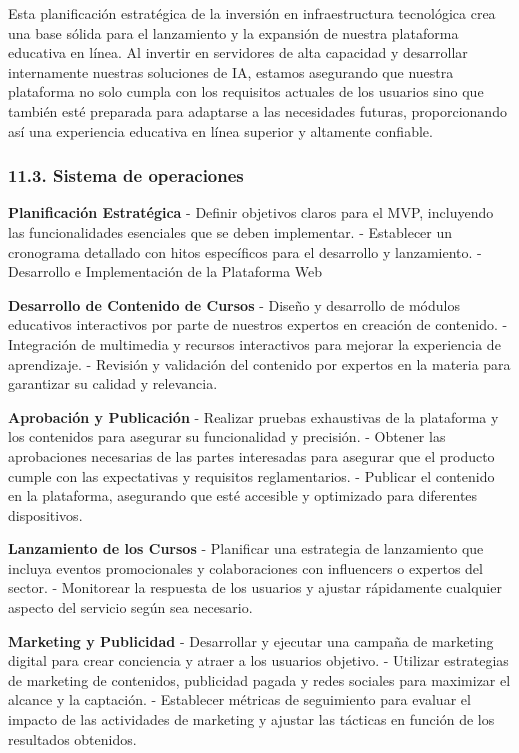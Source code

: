 \documentclass[
]{article}
\begin{document}
Esta planificación estratégica de la inversión en infraestructura
tecnológica crea una base sólida para el lanzamiento y la expansión de
nuestra plataforma educativa en línea. Al invertir en servidores de alta
capacidad y desarrollar internamente nuestras soluciones de IA, estamos
asegurando que nuestra plataforma no solo cumpla con los requisitos
actuales de los usuarios sino que también esté preparada para adaptarse
a las necesidades futuras, proporcionando así una experiencia educativa
en línea superior y altamente confiable.

\subsubsection{11.3. Sistema de
operaciones}\label{sistema-de-operaciones}

\textbf{Planificación Estratégica} - Definir objetivos claros para el
MVP, incluyendo las funcionalidades esenciales que se deben implementar.
- Establecer un cronograma detallado con hitos específicos para el
desarrollo y lanzamiento. - Desarrollo e Implementación de la Plataforma
Web

\textbf{Desarrollo de Contenido de Cursos} - Diseño y desarrollo de
módulos educativos interactivos por parte de nuestros expertos en
creación de contenido. - Integración de multimedia y recursos
interactivos para mejorar la experiencia de aprendizaje. - Revisión y
validación del contenido por expertos en la materia para garantizar su
calidad y relevancia.

\textbf{Aprobación y Publicación} - Realizar pruebas exhaustivas de la
plataforma y los contenidos para asegurar su funcionalidad y precisión.
- Obtener las aprobaciones necesarias de las partes interesadas para
asegurar que el producto cumple con las expectativas y requisitos
reglamentarios. - Publicar el contenido en la plataforma, asegurando que
esté accesible y optimizado para diferentes dispositivos.

\textbf{Lanzamiento de los Cursos} - Planificar una estrategia de
lanzamiento que incluya eventos promocionales y colaboraciones con
influencers o expertos del sector. - Monitorear la respuesta de los
usuarios y ajustar rápidamente cualquier aspecto del servicio según sea
necesario.

\textbf{Marketing y Publicidad} - Desarrollar y ejecutar una campaña de
marketing digital para crear conciencia y atraer a los usuarios
objetivo. - Utilizar estrategias de marketing de contenidos, publicidad
pagada y redes sociales para maximizar el alcance y la captación. -
Establecer métricas de seguimiento para evaluar el impacto de las
actividades de marketing y ajustar las tácticas en función de los
resultados obtenidos.

\newpage
\end{document}
